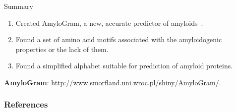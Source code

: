 \documentclass{beamer}\usepackage[]{graphicx}\usepackage[]{color}
\begin{document}
\begin{frame}{Summary}
\begin{enumerate}
\item Created AmyloGram, a new, accurate predictor of amyloids~\citep{BurdukiewiczAmyloidogenicmotifsrevealed2017}.
\item Found a set of amino acid motifs associated with the amyloidogenic properties or the lack of them.
\item Found a simplified alphabet suitable for prediction of amyloid proteins.
\end{enumerate}

\textbf{AmyloGram}: \url{http://www.smorfland.uni.wroc.pl/shiny/AmyloGram/}.

\end{frame}  


\begin{frame}[allowframebreaks]
        \frametitle{References}
  
  
\end{frame}  
\end{document}
